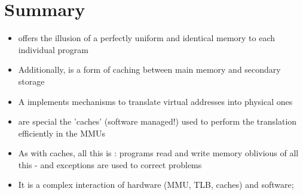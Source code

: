 \section{Summary}
\begin{itemize}
	\item {} offers the illusion of a perfectly uniform and identical memory to each individual program
	\item Additionally,  is a form of caching between main memory and secondary storage
	\item A  implements mechanisms to translate virtual addresses into physical ones
	\item {} are special the 'caches' (software managed!) used to perform the translation efficiently in the MMUs
	\item As with caches, all this is : programs read and write memory oblivious of all this - and exceptions are used to correct problems
	\item It is a complex interaction of hardware (MMU, TLB, caches) and software; 
\end{itemize}











